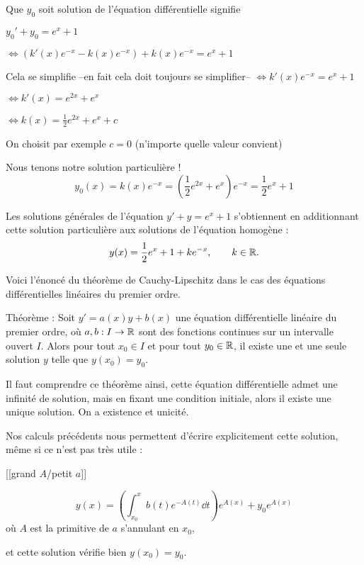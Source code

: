 \change
Que $y_0$ soit solution de l'équation différentielle signifie 

$y_0'+y_0 = e^x+1$

\change
$\iff  \left(k'(x) e^{-x} - k(x) e^{-x} \right) + k(x) e^{-x} = e^x+1$

\change

Cela se simplifie --en fait cela doit toujours se simplifier--
$\iff  k'(x)e^{-x} = e^x+1$

\change
$\iff  k'(x) = e^{2x}+e^x$

\change
$\iff  k(x) = \frac12e^{2x}+e^x + c$

\change
On choisit par exemple $c=0$ (n'importe quelle valeur convient)

Nous tenons notre solution particulière !
$$y_0(x) =  k(x) e^{-x} 
= \left(\frac12e^{2x}+e^x\right)e^{-x} 
= \frac12e^{x}+1$$

\change
Les solutions générales de l'équation
$y'+y = e^x+1$ s'obtiennent en additionnant cette solution 
particulière aux solutions de l'équation homogène :
$$y(x) = \frac12e^{x}+1 + k e^{-x}, \qquad k\in\mathbb{R}.$$

\diapo


Voici l'énoncé du théorème de Cauchy-Lipschitz dans le cas des 
équations différentielles linéaires du premier ordre.

Théorème : 
Soit $y'=a(x)y + b(x)$ une équation différentielle linéaire du premier ordre,
où $a,b : I \to \mathbb{R}$ sont des fonctions continues sur un intervalle ouvert $I$.
Alors pour tout $x_0 \in I$ et pour tout $y_0 \in \mathbb{R}$, il existe une et une 
seule solution $y$ telle que $y(x_0)=y_0$.


Il faut comprendre ce théorème ainsi, cette équation différentielle admet une infinité de solution,
mais en fixant une condition initiale, alors il existe une unique solution. On a existence
et unicité.



\change
Nos calculs précédents nous permettent d'écrire explicitement cette solution, même si ce n'est pas très utile :

[[grand $A$/petit $a$]]

$$y(x) = \left(\int_{x_0}^x b(t)e^{-A(t)}\dd t \right)e^{A(x)} + y_0e^{A(x)}$$
où $A$ est la primitive de $a$ s'annulant en $x_0$, 

et cette solution vérifie bien $y(x_0)=y_0$.


\diapo

